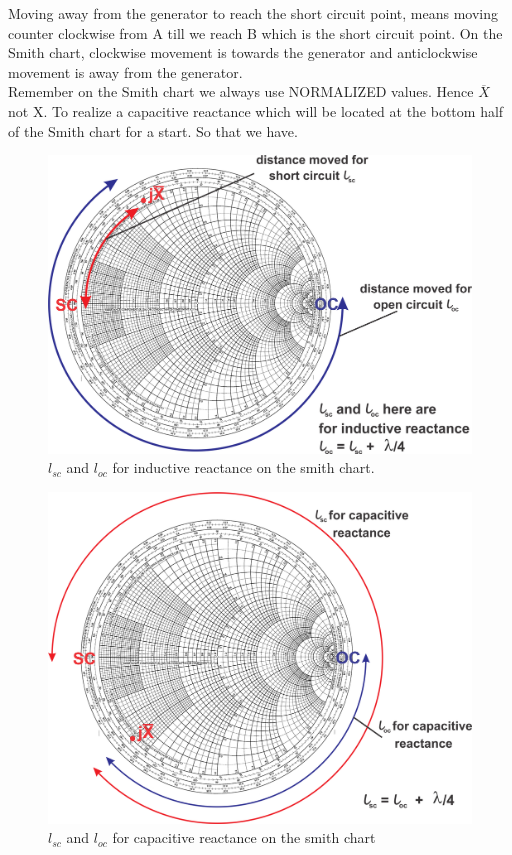 Moving away from the generator to reach the short circuit point, means moving counter clockwise from A till we reach B which is the short circuit point. On the Smith chart, clockwise movement is towards the generator and anticlockwise movement is away from the generator.\\Remember on the Smith chart we always use NORMALIZED values. Hence $ \overline{X} $ not X. To realize a capacitive reactance which will be located at the bottom half of the Smith chart for a start.
So that we have.
\begin{figure}[h]
\centering
\includegraphics[scale=0.4]{./graphics/group10diagram7}
\caption{$ l_{sc} $ and $ l_{oc} $ for inductive reactance on the smith chart.}
\end{figure}

\begin{figure}[h]
\centering
\includegraphics[scale=0.4]{./graphics/group10diagram8}
\caption{$ l_{sc} $ and $ l_{oc} $ for capacitive reactance on the smith chart}
\end{figure}

